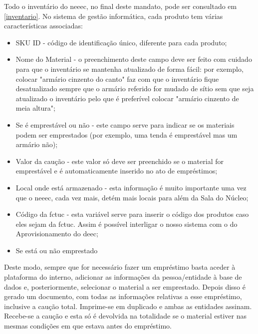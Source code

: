 { %
}
{ %
Todo o inventário do \acrshort{neeec}, no final deste mandato, pode ser consultado em \ref{inventario}.
}
No sistema de gestão informática, cada produto tem várias características associadas: 
\begin{itemize}
\item SKU ID - código de identificação único, diferente para cada produto;
\item Nome do Material - o preenchimento deste campo deve ser feito com cuidado para que o inventário se mantenha atualizado de forma fácil: por exemplo, colocar "armário cinzento do canto" faz com que o inventário fique desatualizado sempre que o armário referido for mudado de sítio sem que seja atualizado o inventário pelo que é preferível colocar "armário cinzento de meia altura";
\item Se é emprestável ou não - este campo serve para indicar se os materiais podem ser emprestados (por exemplo, uma tenda é emprestável mas um armário não);
\item Valor da caução - este valor só deve ser preenchido se o material for emprestável e é automaticamente inserido no ato de empréstimos;
\item Local onde está armazenado - esta informação é muito importante uma vez que o \acrshort{neeec}, cada vez mais, detém mais locais para além da Sala do Núcleo;
\item Código da \acrshort{fctuc} - esta variável serve para inserir o código dos produtos caso eles sejam da \acrshort{fctuc}. Assim é possível interligar o nosso sistema com o do Aprovisionamento do \acrshort{deec};
\item Se está ou não emprestado
\end{itemize}

Deste modo, sempre que for necessário fazer um empréstimo basta aceder à plataforma do interno, adicionar as informações da pessoa/entidade à base de dados e, posteriormente, selecionar o material a ser emprestado. Depois disso é gerado um documento, com todas as informações relativas a esse empréstimo, inclusive a caução total. Imprime-se em duplicado e ambas as entidades assinam. Recebe-se a caução e esta só é devolvida na totalidade se o material estiver nas mesmas condições em que estava antes do empréstimo.